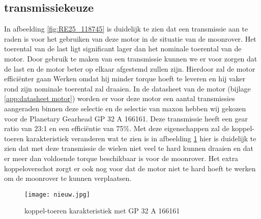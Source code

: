 \newpage

\subsection{transmissiekeuze}
In afbeelding \ref{fig:RE25_118745} is duidelijk te zien dat een transmissie aan te raden is voor het gebruiken van deze motor in de situatie van de moonrover. Het toerental van de last ligt significant lager dan het nominale toerental van de motor. Door gebruik te maken van een transmissie kunnen we er voor zorgen dat de last en de motor beter op elkaar afgestemd zullen zijn. Hierdoor zal de motor efficiënter gaan Werken omdat hij minder torque hoeft te leveren en hij vaker rond zijn nominale toerental zal draaien. In de datasheet van de  motor (bijlage \ref{app:datasheet motor}) worden er voor deze motor een aantal transmissies aangeraden binnen deze selectie en de selectie van maxon hebben wij gekozen voor de Planetary Gearhead GP 32 A 166161. Deze transmissie heeft een gear ratio van 23:1 en een efficiëntie van 75\%. Met deze eigenschappen zal de koppel-toeren karakteristiek veranderen wat te zien is in afbeelding \ref{fig:GP 32 A 166158} hier is duidelijk te zien dat met deze transmissie de wielen niet veel te hard kunnen draaien en dat er meer dan voldoende torque beschikbaar is voor de moonrover. Het extra koppeloverschot zorgt er ook nog voor dat de motor niet te hard hoeft te werken om de moonrover te kunnen verplaatsen.

        \begin{figure}[H]
                \centering
                \texttt{[image: nieuw.jpg]}
                \caption{koppel-toeren karakteristiek met GP 32 A 166161}
                \label{fig:GP 32 A 166158}
        \end{figure}

